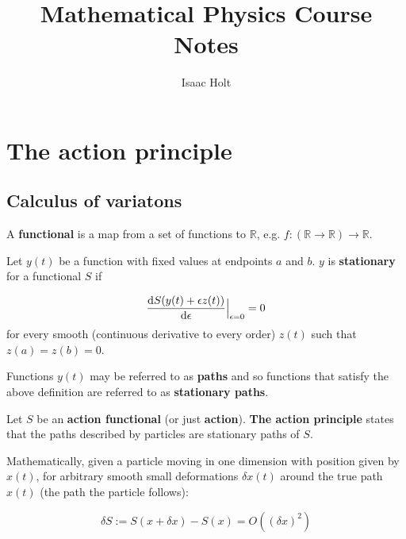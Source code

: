 

\let\oldforall\forall
\renewcommand{\forall}{\ \oldforall}

\let\oldexist\exists
\renewcommand{\exists}{\ \oldexist}

\newcommand\existu{\ \oldexist!}

\title{Mathematical Physics Course Notes}
\author{Isaac Holt}





\section{The action principle}

\subsection{Calculus of variatons}

\begin{definition}
	A \textbf{functional} is a map from a set of functions to $\mathbb{R}$, e.g. $f: (\mathbb{R} \rightarrow \mathbb{R}) \rightarrow \mathbb{R}$.
\end{definition}

\begin{definition}
	Let $y(t)$ be a function with fixed values at endpoints $a$ and $b$. $y$ is \textbf{stationary} for a functional $S$ if

	\[ \diff{S (y(t) + \epsilon z(t))}{\epsilon}\Big|_{\epsilon = 0} = 0 \]
	for every smooth (continuous derivative to every order) $z(t)$ such that $z(a) = z(b) = 0$.
\end{definition}

\begin{remark}
	Functions $y(t)$ may be referred to as \textbf{paths} and so functions that satisfy the above definition are referred to as \textbf{stationary paths}.
\end{remark}

\begin{definition}
	Let $S$ be an \textbf{action functional} (or just \textbf{action}). \textbf{The action principle} states that the paths described by particles are stationary paths of $S$.

	Mathematically, given a particle moving in one dimension with position given by $x(t)$, for arbitrary smooth small deformations $\delta x(t)$ around the true path $x(t)$ (the path the particle follows):

	\[ \delta S := S(x + \delta x) - S(x) = O({(\delta x)}^2) \]
\end{definition}

